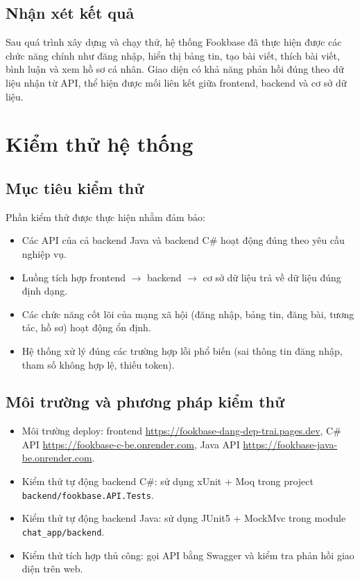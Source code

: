 \documentclass[a4paper,12pt]{article}
\begin{document}
\subsection{Nhận xét kết quả}
Sau quá trình xây dựng và chạy thử, hệ thống Fookbase đã thực hiện được các chức năng chính như đăng nhập, hiển thị bảng tin, tạo bài viết, thích bài viết, bình luận và xem hồ sơ cá nhân. Giao diện có khả năng phản hồi đúng theo dữ liệu nhận từ API, thể hiện được mối liên kết giữa frontend, backend và cơ sở dữ liệu.

\section{Kiểm thử hệ thống}

\subsection{Mục tiêu kiểm thử}
Phần kiểm thử được thực hiện nhằm đảm bảo:
\begin{itemize}
    \item Các API của cả backend Java và backend C\# hoạt động đúng theo yêu cầu nghiệp vụ.
    \item Luồng tích hợp frontend $\rightarrow$ backend $\rightarrow$ cơ sở dữ liệu trả về dữ liệu đúng định dạng.
    \item Các chức năng cốt lõi của mạng xã hội (đăng nhập, bảng tin, đăng bài, tương tác, hồ sơ) hoạt động ổn định.
    \item Hệ thống xử lý đúng các trường hợp lỗi phổ biến (sai thông tin đăng nhập, tham số không hợp lệ, thiếu token).
\end{itemize}

\subsection{Môi trường và phương pháp kiểm thử}
\begin{itemize}
    \item Môi trường deploy: frontend \url{https://fookbase-dang-dep-trai.pages.dev}, C\# API \url{https://fookbase-c-be.onrender.com}, Java API \url{https://fookbase-java-be.onrender.com}.
    \item Kiểm thử tự động backend C\#: sử dụng xUnit + Moq trong project \texttt{backend/fookbase.API.Tests}.
    \item Kiểm thử tự động backend Java: sử dụng JUnit5 + MockMvc trong module \texttt{chat\_app/backend}.
    \item Kiểm thử tích hợp thủ công: gọi API bằng Swagger và kiểm tra phản hồi giao diện trên web.
\end{itemize}
\end{document}
